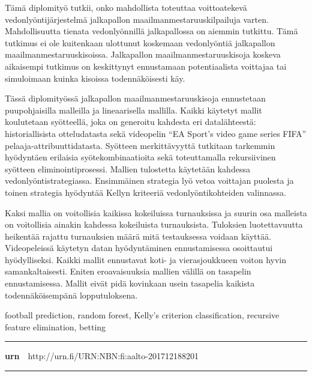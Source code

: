 \begin{spacing}{1.05}

\vspace{.8mm}

{\small
  Tämä diplomityö tutkii, onko mahdollista toteuttaa voittoatekevä vedonlyöntijärjestelmä jalkapallon maailmanmestaruuskilpailuja varten. Mahdollisuutta tienata vedonlyönnillä jalkapallossa on aiemmin tutkittu. Tämä tutkimus ei ole kuitenkaan ulottunut koskemaan vedonlyöntiä jalkapallon maailmanmestaruuskisoissa. Jalkapallon maailmanmestaruuskisoja koskeva aikaisempi tutkimus on keskittynyt ennustamaan potentiaalista voittajaa tai simuloimaan kuinka kisoissa todennäköisesti käy.

  Tässä diplomityössä jalkapallon maailmanmestaruuskisoja ennustetaan puupohjaisilla malleilla ja lineaarisella mallilla. Kaikki käytetyt mallit koulutetaan syötteellä, joka on generoitu kahdesta eri datalähteestä: historiallisista otteludatasta sekä videopelin “EA Sport’s video game series FIFA” pelaaja-attribuuttidatasta. Syötteen merkittävyyttä tutkitaan tarkemmin hyödyntäen erilaisia syötekombinaatioita sekä toteuttamalla rekursiivinen syötteen eliminointiprosessi. Mallien tulostetta käytetään kahdessa vedonlyöntistrategiassa. Ensimmäinen strategia lyö vetoa voittajan puolesta ja toinen strategia hyödyntää Kellyn kriteeriä vedonlyöntikohteiden valinnassa.

  Kaksi mallia on voitollisia kaikissa kokeiluissa turnauksissa ja suurin osa malleista on voitollisia ainakin kahdessa kokeiluista turnauksista. Tuloksien luotettavuutta heikentää rajattu turnauksien määrä mitä testauksessa voidaan käyttää. Videopeleissä käytetyn datan hyödyntäminen ennustamisessa osoittautui hyödylliseksi. Kaikki mallit ennustavat koti- ja vierasjoukkueen voiton hyvin samankaltaisesti. Eniten eroavaisuuksia mallien välillä on tasapelin ennustamisessa. Mallit eivät pidä kovinkaan usein tasapelia kaikista todennäköisempänä lopputuloksena.
}

\vfill

\end{spacing}
\begin{spacing}{.88}
{\parindent0pt %

\parbox[t]{121.6mm}{\raggedright\small football prediction, random forest, Kelly's criterion  classification, recursive feature elimination, betting}

\vspace{.5mm}\rule{\textwidth}{.75pt}

{\fontsize{10.5pt}{10.5pt}\bfseries\sffamily\lsstyle urn}~~{\small http://urn.fi/URN:NBN:fi:aalto-201712188201}

\vspace{-2.4mm}\rule{\textwidth}{.75pt}

} %
\end{spacing}

